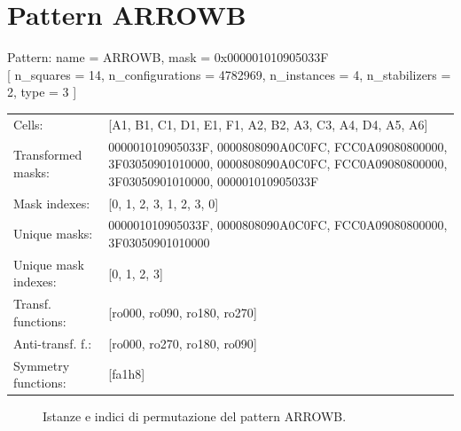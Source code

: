 \newpage

\section{Pattern ARROWB}

\begin{tcolorbox}[sharp corners, fontupper=\ttfamily\small, colback=white]
  \noindent Pattern: name = ARROWB, mask = 0x000001010905033F\\
  {[} n\_squares = 14, n\_configurations = 4782969,
  n\_instances = 4, n\_stabilizers = 2, type = 3 { ]}\\[1.0ex]
  \begin{tabularx}{\textwidth}{@{} p{3.5cm} X @{}}
    Cells:               & {[}A1, B1, C1, D1, E1, F1, A2, B2, A3, C3, A4, D4, A5, A6{]}\\[0.5ex]
    Transformed masks:   & 000001010905033F, 0000808090A0C0FC, FCC0A09080800000, 3F03050901010000, 0000808090A0C0FC, FCC0A09080800000, 3F03050901010000, 000001010905033F\\[0.5ex]
    Mask indexes:        & {[}0, 1, 2, 3, 1, 2, 3, 0{]}\\[0.5ex]
    Unique masks:        & 000001010905033F, 0000808090A0C0FC, FCC0A09080800000, 3F03050901010000\\[0.5ex]
    Unique mask indexes: & {[}0, 1, 2, 3{]}\\[0.5ex]
    Transf. functions:   & {[}ro000, ro090, ro180, ro270{]}\\[0.5ex]
    Anti-transf. f.:     & {[}ro000, ro270, ro180, ro090{]}\\[0.5ex]
    Symmetry functions:  & {[}fa1h8{]}\\[0.5ex]
  \end{tabularx}
\end{tcolorbox}

\begin{figure}[htbp]
  \centering
   \hfill
   \hfill
   \hfill
  \vspace{0.3cm}
   \hfill
   \hfill
   \hfill
  \caption{Istanze e indici di permutazione del pattern ARROWB.}
\end{figure}

